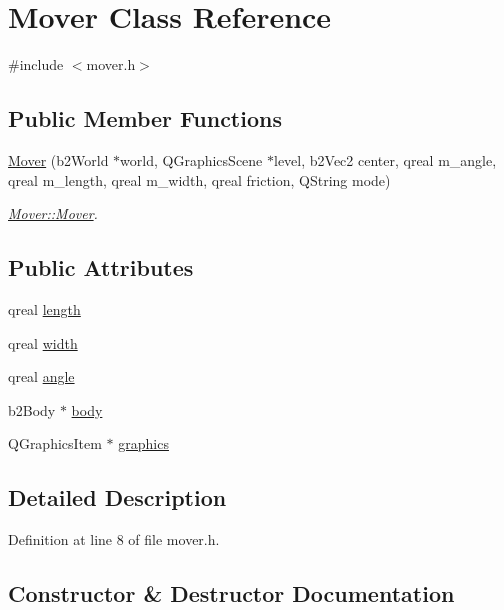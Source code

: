 \hypertarget{class_mover}{}\section{Mover Class Reference}
\label{class_mover}


{\ttfamily \#include $<$mover.\+h$>$}

\subsection*{Public Member Functions}
\begin{DoxyCompactItemize}
\item 
\hyperlink{class_mover_a8ec5e7ce87190ce9b25f1df64efa7821}{Mover} (b2\+World $\ast$world, Q\+Graphics\+Scene $\ast$level, b2\+Vec2 center, qreal m\+\_\+angle, qreal m\+\_\+length, qreal m\+\_\+width, qreal friction, Q\+String mode)
\begin{DoxyCompactList}\small\item\em \hyperlink{class_mover_a8ec5e7ce87190ce9b25f1df64efa7821}{Mover\+::\+Mover}. \end{DoxyCompactList}\end{DoxyCompactItemize}
\subsection*{Public Attributes}
\begin{DoxyCompactItemize}
\item 
qreal \hyperlink{class_mover_a2c55f3d5a807d328bcc8c73cdef5dda2}{length}
\item 
qreal \hyperlink{class_mover_ab78fbf587764d7cdcd417d2a444408d4}{width}
\item 
qreal \hyperlink{class_mover_acb7d779b2ce97a86149990dce48e88b5}{angle}
\item 
b2\+Body $\ast$ \hyperlink{class_mover_a6e91384098180f0fef918dd45f97f201}{body}
\item 
Q\+Graphics\+Item $\ast$ \hyperlink{class_mover_a111eebc06a95c11dc6f48dcc6a33478f}{graphics}
\end{DoxyCompactItemize}


\subsection{Detailed Description}


Definition at line 8 of file mover.\+h.



\subsection{Constructor \& Destructor Documentation}
